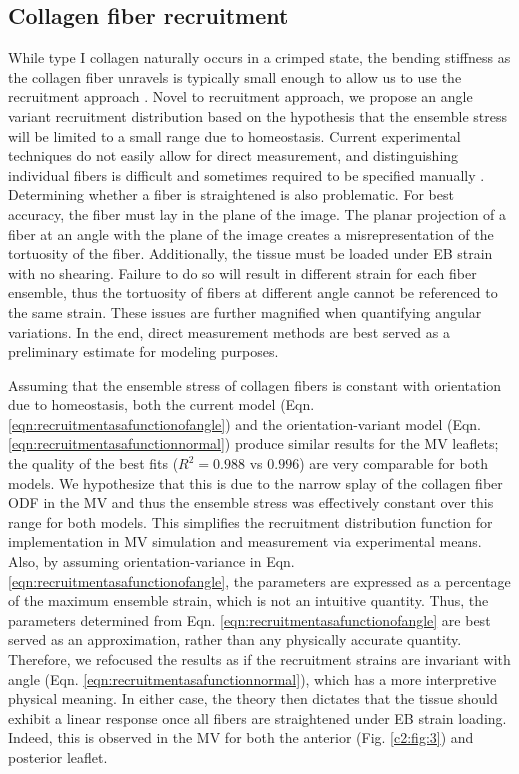     
    
    
\subsection{Collagen fiber recruitment}

    While type I collagen naturally occurs in a crimped state, the bending stiffness as the collagen fiber unravels is typically small enough to allow us to use the recruitment approach \cite{lanir_constitutive_1983,fata_insights_2014,sacks_incorporation_2003,lanir_structural_1979,kastelic_structural_1980,hansen_recruitment_2002,cacho_constitutive_2007,grytz_constitutive_2009}. Novel to recruitment approach, we propose an angle variant recruitment distribution based on the hypothesis that the ensemble stress will be limited to a small range due to homeostasis. Current experimental techniques do not easily allow for direct measurement, and distinguishing individual fibers is difficult and sometimes required to be specified manually \cite{hill_theoretical_2012}. Determining whether a fiber is straightened is also problematic. For best accuracy, the fiber must lay in the plane of the image. The planar projection of a fiber at an angle with the plane of the image creates a misrepresentation of the tortuosity of the fiber. Additionally, the tissue must be loaded under EB strain with no shearing. Failure to do so will result in different strain for each fiber ensemble, thus the tortuosity of fibers at different angle cannot be referenced to the same strain. These issues are further magnified when quantifying angular variations. In the end, direct measurement methods are best served as a preliminary estimate for modeling purposes.


    Assuming that the ensemble stress of collagen fibers is constant with orientation due to homeostasis, both the current model (Eqn. \ref{eqn:recruitmentasafunctionofangle}) and the orientation-variant model (Eqn. \ref{eqn:recruitmentasafunctionnormal}) produce similar results for the MV leaflets; the quality of the best fits ($R^2 = 0.988$ vs $0.996$) are very comparable for both models. We hypothesize that this is due to the narrow splay of the collagen fiber ODF in the MV and thus the ensemble stress was effectively constant over this range for both models. This simplifies the recruitment distribution function for implementation in MV simulation and measurement via experimental means. Also, by assuming orientation-variance in Eqn. \ref{eqn:recruitmentasafunctionofangle}, the parameters are expressed as a percentage of the maximum ensemble strain, which is not an intuitive quantity. Thus, the parameters determined from Eqn. \ref{eqn:recruitmentasafunctionofangle} are best served as an approximation, rather than any physically accurate quantity. Therefore, we refocused the results as if the recruitment strains are invariant with angle (Eqn. \ref{eqn:recruitmentasafunctionnormal}), which has a more interpretive physical meaning. In either case, the theory then dictates that the tissue should exhibit a linear response once all fibers are straightened under EB strain loading. Indeed, this is observed in the MV for both the anterior (Fig. \ref{c2:fig:3}) and posterior leaflet.


